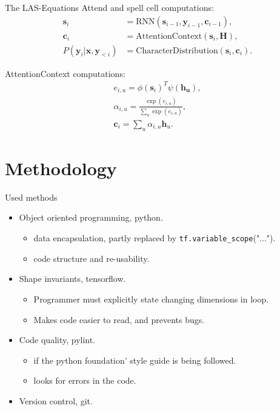 \documentclass{beamer}
\begin{document}
\begin{frame}{The LAS-Equations}
Attend and spell cell computations:
\begin{align}
	 \mathbf{s}_i &= \text{RNN}(\mathbf{s}_{i-1}, \mathbf{y}_{i-1}, \mathbf{c}_{i-1}), \\
	 \mathbf{c}_i &= \text{AttentionContext}(\mathbf{s}_i,\mathbf{H}), \\
	  P(\mathbf{y}_i|\mathbf{x}, \mathbf{y}_{<i}) &= \text{CharacterDistribution}(\mathbf{s}_i,\textbf{c}_i).
\end{align}

AttentionContext computations:
\begin{align}
	e_{i,u} = \phi(\mathbf{s}_i)^T \psi(\mathbf{h_u}), \\
	\alpha_{i,u} = \frac{ \exp(e_{i,u})}{ \sum\limits_{u} \exp(e_{i,u})}, \\
	\label{eq:alphas}
	\mathbf{c}_i = \sum\limits_{u} \alpha_{i,u} \mathbf{h}_u.
\end{align}
\end{frame}


\section{Methodology}
\begin{frame}{Used methods}
	\begin{itemize}
		\item Object oriented programming, python.
			\begin{itemize}
				\item data encapsulation, partly replaced by \texttt{tf.variable\_scope}("...").
				\item code structure and re-usability.
			\end{itemize}
		\item Shape invariants, tensorflow.
			\begin{itemize}
				\item Programmer must explicitly state changing dimensions in loop.
				\item Makes code easier to read, and prevents bugs.
			\end{itemize}
		\item Code quality, pylint.
			\begin{itemize}
				\item if the python foundation' style guide is being followed. 
				\item looks for errors in the code.
			\end{itemize}
		\item Version control, git.
	\end{itemize}
\end{frame}
\end{document}

